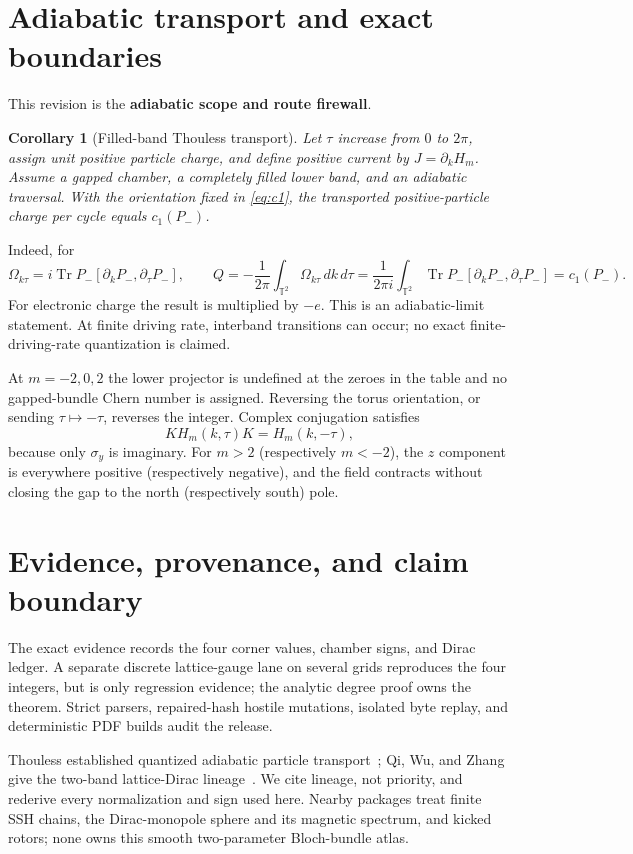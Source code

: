 \documentclass[10pt]{article}
\newtheorem{corollary}{Corollary}
\newcommand{\Tr}{\operatorname{Tr}}
\newcommand{\T}{\mathbb T}
\begin{document}
\section{Adiabatic transport and exact boundaries}
This revision is the \textbf{adiabatic scope and route firewall}.
\begin{corollary}[Filled-band Thouless transport]
Let $\tau$ increase from $0$ to $2\pi$, assign unit positive particle charge,
and define positive current by $J=\partial_kH_m$.  Assume a gapped chamber, a
completely filled lower band, and an adiabatic traversal.  With the orientation
fixed in \eqref{eq:c1}, the transported positive-particle charge per cycle
equals $c_1(P_-)$.
\end{corollary}
Indeed, for
\[
\Omega_{k\tau}=i\Tr P_-[\partial_kP_-,\partial_\tau P_-],
\qquad
Q=-\frac1{2\pi}\int_{\T^2}\Omega_{k\tau}\,dk\,d\tau
  =\frac1{2\pi i}\int_{\T^2}\Tr P_-[\partial_kP_-,\partial_\tau P_-]
  =c_1(P_-).
\]
For electronic charge the result is multiplied by $-e$.
This is an adiabatic-limit statement.  At finite driving rate, interband
transitions can occur; no exact finite-driving-rate quantization is claimed.

At $m=-2,0,2$ the lower projector is undefined at the zeroes in the table and
no gapped-bundle Chern number is assigned.  Reversing the torus orientation,
or sending $\tau\mapsto-\tau$, reverses the integer.  Complex conjugation
satisfies
\[
K H_m(k,\tau)K=H_m(k,-\tau),
\]
because only $\sigma_y$ is imaginary.  For $m>2$ (respectively $m<-2$), the
$z$ component is everywhere positive (respectively negative), and the field
contracts without closing the gap to the north (respectively south) pole.

\section{Evidence, provenance, and claim boundary}
The exact evidence records the four corner values, chamber signs, and Dirac
ledger.  A separate discrete lattice-gauge lane on several grids reproduces
the four integers, but is only regression evidence; the analytic degree proof
owns the theorem.  Strict parsers, repaired-hash hostile mutations, isolated
byte replay, and deterministic PDF builds audit the release.

Thouless established quantized adiabatic particle transport~\cite{Thouless};
Qi, Wu, and Zhang give the two-band lattice-Dirac lineage~\cite{QWZ}.  We cite
lineage, not priority, and rederive every normalization and sign used here.
Nearby packages treat finite SSH chains, the Dirac-monopole sphere and its
magnetic spectrum, and kicked rotors; none owns this smooth two-parameter
Bloch-bundle atlas.
\end{document}
